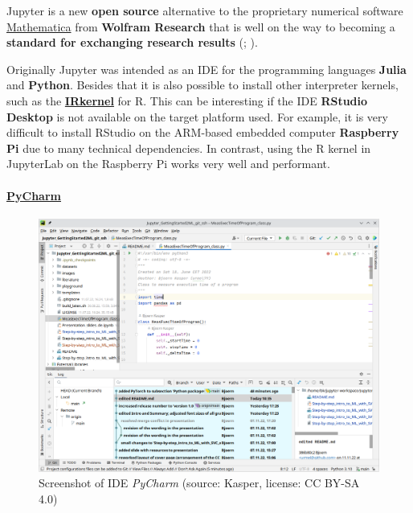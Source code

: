 \documentclass [oneside,10pt,a4paper,ngerman,BCOR10mm,headsepline,parindent,final]{scrartcl}
\begin{document}
Jupyter is a new \textbf{open source} alternative to the proprietary
numerical software
\href{https://en.wikipedia.org/wiki/Wolfram_Mathematica}{Mathematica}
from \textbf{Wolfram Research} that is well on the way to becoming a
\textbf{standard for exchanging research results}
(\cite{Scientific_Paper_obsolete_2018};
\cite{Future_of_Research_Paper_2018}).

Originally Jupyter was intended as an IDE for the programming languages
\textbf{Julia} and \textbf{Python}. Besides that it is also possible to
install other interpreter kernels, such as the
\textbf{\href{https://irkernel.github.io/installation/}{IRkernel}} for
R. This can be interesting if the IDE \textbf{RStudio Desktop} is not
available on the target platform used. For example, it is very difficult
to install RStudio on the ARM-based embedded computer \textbf{Raspberry
Pi} due to many technical dependencies. In contrast, using the R kernel
in JupyterLab on the Raspberry Pi works very well and performant.

    \hypertarget{pycharm}{%
\paragraph{\texorpdfstring{\href{https://de.wikipedia.org/wiki/PyCharm}{PyCharm}}{PyCharm}}\label{pycharm}}

\begin{figure}
\centering
\includegraphics{images/Screenshot_PyCharm.png}
\caption{Screenshot of IDE \emph{PyCharm} (source: Kasper, license: CC
BY-SA 4.0)}
\end{figure}
\end{document}
